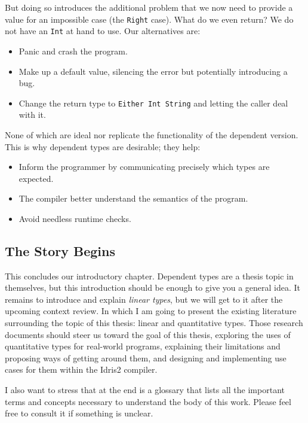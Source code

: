 \documentclass[
]{article}
\providecommand{\tightlist}{%
  \setlength{\itemsep}{0pt}\setlength{\parskip}{0pt}}
\begin{document}
But doing so introduces the additional problem that we now need to
provide a value for an impossible case (the \texttt{Right} case). What
do we even return? We do not have an \texttt{Int} at hand to use. Our
alternatives are:

\begin{itemize}
\tightlist
\item
  Panic and crash the program.
\item
  Make up a default value, silencing the error but potentially
  introducing a bug.
\item
  Change the return type to \texttt{Either\ Int\ String} and letting the
  caller deal with it.
\end{itemize}

None of which are ideal nor replicate the functionality of the dependent
version. This is why dependent types are desirable; they help:

\begin{itemize}
\tightlist
\item
  Inform the programmer by communicating precisely which types are
  expected.
\item
  The compiler better understand the semantics of the program.
\item
  Avoid needless runtime checks.
\end{itemize}

\hypertarget{the-story-begins}{%
\subsection{The Story Begins}\label{the-story-begins}}

This concludes our introductory chapter. Dependent types are a thesis
topic in themselves, but this introduction should be enough to give you
a general idea. It remains to introduce and explain \emph{linear types},
but we will get to it after the upcoming context review. In which I am
going to present the existing literature surrounding the topic of this
thesis: linear and quantitative types. Those research documents should
steer us toward the goal of this thesis, exploring the uses of
quantitative types for real-world programs, explaining their limitations
and proposing ways of getting around them, and designing and
implementing use cases for them within the Idris2 compiler.

I also want to stress that at the end is a glossary that lists all the
important terms and concepts necessary to understand the body of this
work. Please feel free to consult it if something is unclear.
\end{document}
